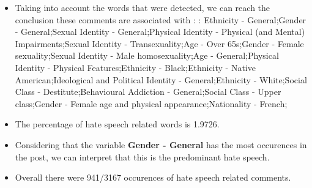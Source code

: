 \documentclass[11pt]{article}
\begin{document}
\begin{itemize}\item Taking into account the words that were detected, we can reach the conclusion these comments are associated with : : Ethnicity - General;Gender - General;Sexual Identity - General;Physical Identity - Physical (and Mental) Impairments;Sexual Identity - Transexuality;Age - Over 65s;Gender - Female sexuality;Sexual Identity - Male homosexuality;Age - General;Physical Identity - Physical Features;Ethnicity - Black;Ethnicity - Native American;Ideological and Political Identity - General;Ethnicity - White;Social Class - Destitute;Behavioural Addiction - General;Social Class - Upper class;Gender - Female age and physical appearance;Nationality - French;%

\item The percentage of hate speech related words is 1.9726.

\item Considering that the variable \textbf{Gender - General} has the most occurences in the post, we can interpret that this is the predominant hate speech.

\item Overall there were 941/3167 occurences of hate speech related comments.\end{itemize}
\end{document}
